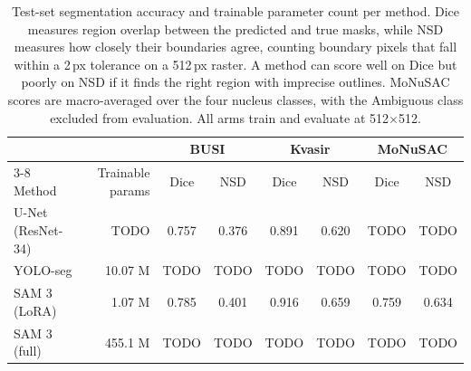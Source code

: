 %

\begin{table}[t]
\centering
\begin{tabular*}{\textwidth}{@{\extracolsep{\fill}}lrcccccc@{}}
\hline
 & & \multicolumn{2}{c}{BUSI} & \multicolumn{2}{c}{Kvasir} & \multicolumn{2}{c}{MoNuSAC} \\
\cline{3-8}
Method & Trainable params & Dice & NSD & Dice & NSD & Dice & NSD \\
\hline
U-Net (ResNet-34)  & TODO     & 0.757 & 0.376 & 0.891 & 0.620 & TODO  & TODO  \\
YOLO-seg           & 10.07 M  & TODO  & TODO  & TODO  & TODO  & TODO  & TODO  \\
SAM 3 (LoRA)       & 1.07 M   & 0.785 & 0.401 & 0.916 & 0.659 & 0.759 & 0.634 \\
SAM 3 (full)       & 455.1 M  & TODO  & TODO  & TODO  & TODO  & TODO  & TODO  \\
\hline
\end{tabular*}
\caption{Test-set segmentation accuracy and trainable parameter count per method.
Dice measures region overlap between the predicted and true masks, while NSD
measures how closely their boundaries agree, counting boundary pixels that fall
within a 2\,px tolerance on a 512\,px raster. A method can score well on Dice but
poorly on NSD if it finds the right region with imprecise outlines. MoNuSAC scores
are macro-averaged over the four nucleus classes, with the Ambiguous class excluded
from evaluation. All arms train and evaluate at 512$\times$512.}
\label{tab:main}
\end{table}



